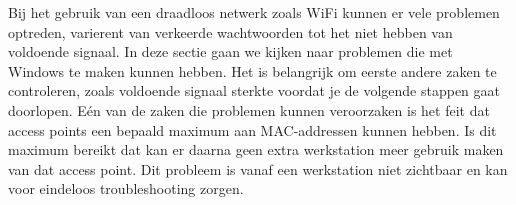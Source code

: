 Bij het gebruik van een draadloos netwerk zoals WiFi kunnen er vele problemen optreden, varierent van verkeerde wachtwoorden tot het niet hebben van voldoende signaal. In deze sectie gaan we kijken naar problemen die met Windows te maken kunnen hebben. Het is belangrijk om eerste andere zaken te controleren, zoals voldoende signaal sterkte voordat je de volgende stappen gaat doorlopen. E\'en van de zaken die problemen kunnen veroorzaken is het feit dat access points een bepaald maximum aan MAC-addressen kunnen hebben. Is dit maximum bereikt dat kan er daarna geen extra werkstation meer gebruik maken van dat access point. Dit probleem is vanaf een werkstation niet zichtbaar en kan voor eindeloos troubleshooting zorgen.

